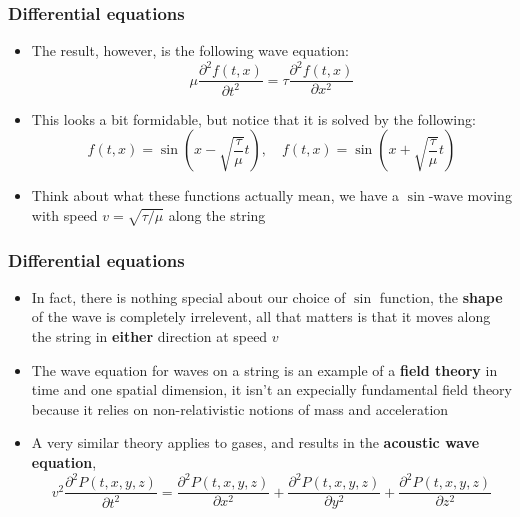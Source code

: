\documentclass{beamer}
\begin{document}
\begin{frame}
  \frametitle{Differential equations}
  \begin{itemize}
    \item<1-> The result, however, is the following wave equation:
      \begin{equation*}
	\mu\frac{\partial^2f(t,x)}{\partial t^2}=\tau\frac{\partial^2f(t,x)}{\partial x^2}
      \end{equation*}
    \item<2-> This looks a bit formidable, but notice that it is solved by the following:
      \begin{equation*}
	f(t,x)=\sin\left(x-\sqrt{\frac{\tau}{\mu}}t\right), \quad f(t,x)=\sin\left(x+\sqrt{\frac{\tau}{\mu}}t\right)
      \end{equation*}
    \item<3-> Think about what these functions actually mean, we have a $\sin$-wave moving with speed $v=\sqrt{\tau/\mu}$ along the string
  \end{itemize}
\end{frame}

\begin{frame}
  \frametitle{Differential equations}
  \begin{itemize}
    \item<1-> In fact, there is nothing special about our choice of $\sin$ function, the \textbf{shape} of the wave is completely irrelevent, all that matters is that it moves along the string in \textbf{either} direction at speed $v$
    \item<2-> The wave equation for waves on a string is an example of a \textbf{field theory} in time and one spatial dimension, it isn't an expecially fundamental field theory because it relies on non-relativistic notions of mass and acceleration
    \item<3-> A very similar theory applies to gases, and results in the \textbf{acoustic wave equation},
      \begin{equation*}
	v^2\frac{\partial^2P(t,x,y,z)}{\partial t^2}=\frac{\partial^2P(t,x,y,z)}{\partial x^2}+\frac{\partial^2P(t,x,y,z)}{\partial y^2}+\frac{\partial^2P(t,x,y,z)}{\partial z^2}
      \end{equation*}
  \end{itemize}
\end{frame}
\end{document}
